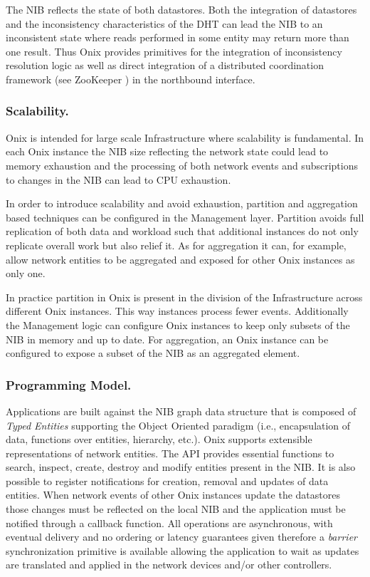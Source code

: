 \begin{itemize}
The NIB reflects the state of both datastores. Both the integration of
datastores and the inconsistency  characteristics of the DHT can lead the
NIB to an inconsistent state where reads performed in some entity may
return more than one result. Thus Onix provides primitives
for the integration of inconsistency resolution logic as well as 
direct integration of a distributed
coordination framework (see  ZooKeeper \cite{Hunt:2010ux}) in the
northbound interface. 

\subsubsection{Scalability.} Onix is intended for large scale Infrastructure where scalability is
fundamental. In each Onix instance the NIB
size reflecting the network state could lead to memory
exhaustion   and the processing of both network events and
subscriptions 
to changes in  the NIB can lead to CPU exhaustion.

In order to introduce scalability and avoid exhaustion, partition and
aggregation based techniques can be configured in the Management
layer. Partition avoids full replication of both data  and workload
such that additional instances do not only replicate overall work but
also relief it. As for aggregation it can, for example, allow network entities to be
aggregated and exposed for other Onix instances as only one.

In practice partition in Onix is present in the division of the
Infrastructure across different Onix instances. 
This way
instances process fewer events. Additionally the Management logic can
configure Onix instances to keep only subsets of the NIB in memory and
up to date. For aggregation, an Onix instance can be configured to
expose a subset of the NIB as an aggregated element. 

\subsubsection{Programming Model.} Applications are built against the NIB graph data structure that is
composed of \emph{Typed Entities} supporting the Object
Oriented paradigm (i.e., encapsulation of data, functions over
entities, hierarchy, etc.). Onix supports extensible representations of
network entities. The
API provides essential functions to search, inspect, create, destroy and
modify entities present in the NIB. It is also possible to register
notifications for creation, removal and updates of data
entities. When network events of other Onix instances update the
datastores those changes must be reflected on the local NIB and the
application must be notified through a callback function. 
All operations are asynchronous, with
eventual delivery and no ordering or latency guarantees given
therefore a \emph{barrier} synchronization primitive is available
allowing the application to wait as
updates are translated and applied in the network devices and/or other
controllers. 


\end{itemize}
